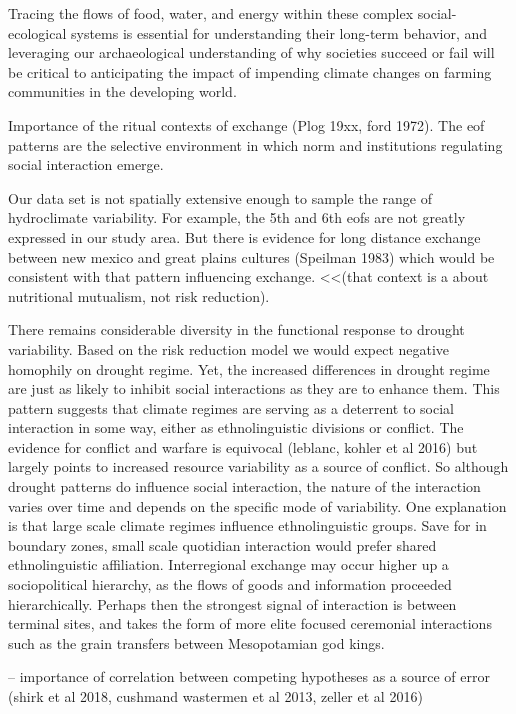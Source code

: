 \documentclass[11pt]{wlscirep}
\begin{document}
Tracing the flows of food, water, and energy within these complex social-ecological systems is essential for understanding their long-term behavior, and leveraging our archaeological understanding of why societies succeed or fail will be critical to anticipating the impact of impending climate changes on farming communities in the developing world.

Importance of the ritual contexts of exchange (Plog 19xx, ford 1972). The eof patterns are the selective environment in which norm and institutions regulating social interaction emerge. 

Our data set is not spatially extensive enough to sample the range of hydroclimate variability. For example, the 5th and 6th eofs are not greatly expressed in our study area. But there is evidence for long distance exchange between new mexico and great plains cultures (Speilman 1983) which would be consistent with that pattern influencing exchange. <<(that context is a about nutritional mutualism, not risk reduction).

There remains considerable diversity in the functional response to drought variability. Based on the risk reduction model we would expect negative homophily on drought regime. Yet, the increased differences in drought regime are just as likely to inhibit social interactions as they are to enhance them. This pattern suggests that climate regimes are serving as a deterrent to social interaction in some way, either as ethnolinguistic divisions or conflict. The evidence for conflict and warfare is equivocal (leblanc, kohler et al 2016) but largely points to increased resource variability as a source of conflict. So although drought patterns do influence social interaction, the nature of the interaction varies over time and depends on the specific mode of variability. One explanation is that large scale climate regimes influence ethnolinguistic groups. Save for in boundary zones, small scale quotidian interaction would prefer shared ethnolinguistic affiliation. Interregional exchange may occur higher up a sociopolitical hierarchy, as the flows of goods and information proceeded hierarchically. Perhaps then the strongest signal of interaction is between terminal sites, and takes the form of more elite focused ceremonial interactions such as the grain transfers between Mesopotamian god kings.

-- importance of correlation between competing hypotheses as a source of error (shirk et al 2018, cushmand wastermen et al 2013, zeller et al 2016)
\end{document}
